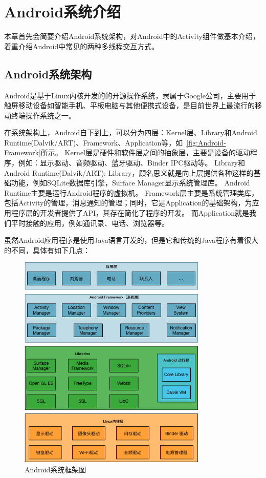 \chapter{Android系统介绍 }  
\label{chp:background}


本章首先会简要介绍Android系统架构，对Android中的Activity组件做基本介绍，着重介绍Android中常见的两种多线程交互方式。


\section{Android系统架构}

Android是基于Linux内核开发的的开源操作系统，隶属于Google公司，主要用于触屏移动设备如智能手机、平板电脑与其他便携式设备，是目前世界上最流行的移动终端操作系统之一。


在系统架构上，Android自下到上，可以分为四层：Kernel层、Library和Android Runtime(Dalvik/ART)、Framework、Application等，如~\autoref{fig:Android-Framework}所示。
Kernel层是硬件和软件层之间的抽象层，主要是设备的驱动程序，例如：显示驱动、音频驱动、蓝牙驱动、Binder IPC驱动等。
Library和Android Runtime(Dalvik/ART): Library，顾名思义就是向上层提供各种这样的基础功能，例如SQLite数据库引擎，Surface Manager显示系统管理库。
Android Runtime主要是运行Android程序的虚拟机。
Framework层主要是系统管理类库，包括Activity的管理，消息通知的管理；同时，它是Application的基础架构，为应用程序层的开发者提供了API，其存在简化了程序的开发。
而Application就是我们平时接触的应用，例如通讯录、电话、浏览器等。

虽然Android应用程序是使用Java语言开发的，但是它和传统的Java程序有着很大的不同，具体有如下几点：

\begin{figure}[!h]
	\centering
	\includegraphics[width=0.8\textwidth]{./Figures/Android-Framework.png}
	\caption{Android系统框架图}
	\label{fig:Android-Framework}
\end{figure}


